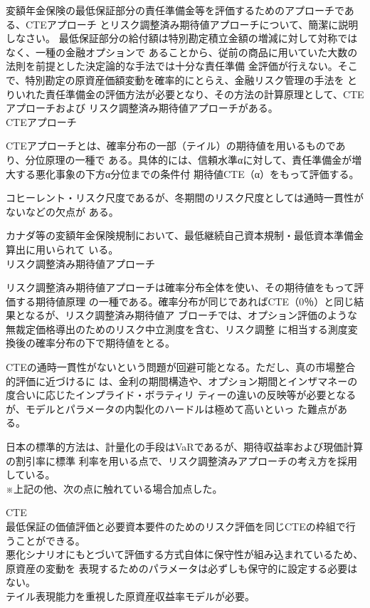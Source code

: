 \documentclass[report,gutter=10mm,fore-edge=10mm,uplatex,dvipdfmx]{jlreq}
\begin{document}
変額年金保険の最低保証部分の責任準備金等を評価するためのアプローチである、CTEアプローチ
とリスク調整済み期待値アプローチについて、簡潔に説明しなさい。
\answer{}
最低保証部分の給付額は特別勘定積立金額の増減に対して対称ではなく、一種の金融オプションで
あることから、従前の商品に用いていた大数の法則を前提とした決定論的な手法では十分な責任準備
金評価が行えない。そこで、特別勘定の原資産価額変動を確率的にとらえ、金融リスク管理の手法を
とりいれた責任準備金の評価方法が必要となり、その方法の計算原理として、CTEアプローチおよび
リスク調整済み期待値アプローチがある。\\
CTEアプローチ

CTEアプローチとは、確率分布の一部（テイル）の期待値を用いるものであり、分位原理の一種で
ある。具体的には、信頼水準αに対して、責任準備金が増大する悪化事象の下方α分位までの条件付
期待値CTE（α）をもって評価する。

コヒーレント・リスク尺度であるが、冬期間のリスク尺度としては通時一貫性がないなどの欠点が
ある。

カナダ等の変額年金保険規制において、最低継続自己資本規制・最低資本準備金算出に用いられて
いる。\\
リスク調整済み期待値アプローチ

リスク調整済み期待値アプローチは確率分布全体を使い、その期待値をもって評価する期待値原理
の一種である。確率分布が同じであればCTE（0％）と同じ結果となるが、リスク調整済み期待値ア
ブローチでは、オプション評価のような無裁定価格導出のためのリスク中立測度を含む、リスク調整
に相当する測度変換後の確率分布の下で期待値をとる。

CTEの通時一貫性がないという問題が回避可能となる。ただし、真の市場整合的評価に近づけるに
は、金利の期間構造や、オプション期間とインザマネーの度合いに応じたインプライド・ボラティリ
ティーの違いの反映等が必要となるが、モデルとパラメータの内製化のハードルは極めて高いといっ
た難点がある。

日本の標準的方法は、計量化の手段はVaRであるが、期待収益率および現価計算の割引率に標準
利率を用いる点で、リスク調整済みアプローチの考え方を採用している。\\
※上記の他、次の点に触れている場合加点した。\vspace{1zh}

CTE\\
最低保証の価値評価と必要資本要件のためのリスク評価を同じCTEの枠組で行うことができる。\\
悪化シナリオにもとづいて評価する方式自体に保守性が組み込まれているため、原資産の変動を
表現するためのパラメータは必ずしも保守的に設定する必要はない。\\
テイル表現能力を重視した原資産収益率モデルが必要。
\end{document}
